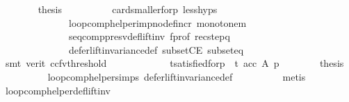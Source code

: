 \begin{isabellebody}
\ \ \ \ \ \ \isamarkupfalse%
\ {\isacharquery}{\kern0pt}thesis\isanewline
\ \ \ \ \ \ \ \ \isamarkupfalse%
\ card{\isacharunderscore}{\kern0pt}smaller{\isacharunderscore}{\kern0pt}for{\isacharunderscore}{\kern0pt}p\ less{\isachardot}{\kern0pt}hyps\isanewline
\ \ \ \ \ \ \ \ \ \ \ \ \ \ loop{\isacharunderscore}{\kern0pt}comp{\isacharunderscore}{\kern0pt}helper{\isacharunderscore}{\kern0pt}imp{\isacharunderscore}{\kern0pt}no{\isacharunderscore}{\kern0pt}def{\isacharunderscore}{\kern0pt}incr\ monotone{\isacharunderscore}{\kern0pt}m\isanewline
\ \ \ \ \ \ \ \ \ \ \ \ \ \ seq{\isacharunderscore}{\kern0pt}comp{\isacharunderscore}{\kern0pt}presv{\isacharunderscore}{\kern0pt}def{\isacharunderscore}{\kern0pt}lift{\isacharunderscore}{\kern0pt}inv\ f{\isacharunderscore}{\kern0pt}prof\ rec{\isacharunderscore}{\kern0pt}step{\isacharunderscore}{\kern0pt}q\isanewline
\ \ \ \ \ \ \ \ \ \ \ \ \ \ defer{\isacharunderscore}{\kern0pt}lift{\isacharunderscore}{\kern0pt}invariance{\isacharunderscore}{\kern0pt}def\ subsetCE\ subset{\isacharunderscore}{\kern0pt}eq\isanewline
\ \ \ \ \ \ \ \ \isamarkupfalse%
\ {\isacharparenleft}{\kern0pt}smt\ {\isacharparenleft}{\kern0pt}verit{\isacharcomma}{\kern0pt}\ ccfv{\isacharunderscore}{\kern0pt}threshold{\isacharparenright}{\kern0pt}{\isacharparenright}{\kern0pt}\isanewline
\ \ \ \ \isamarkupfalse%
\isanewline
\ \ \ \ \ \ \isamarkupfalse%
\ t{\isacharunderscore}{\kern0pt}satisfied{\isacharunderscore}{\kern0pt}for{\isacharunderscore}{\kern0pt}p{\isacharcolon}{\kern0pt}\ {\isachardoublequoteopen}{\isasymnot}\ {\isasymnot}t\ {\isacharparenleft}{\kern0pt}acc\ A\ p{\isacharparenright}{\kern0pt}{\isachardoublequoteclose}\isanewline
\ \ \ \ \ \ \isamarkupfalse%
\ {\isacharquery}{\kern0pt}thesis\isanewline
\ \ \ \ \ \ \ \ \isamarkupfalse%
\ loop{\isacharunderscore}{\kern0pt}comp{\isacharunderscore}{\kern0pt}helper{\isachardot}{\kern0pt}simps{\isacharparenleft}{\kern0pt}{}{\isacharparenright}{\kern0pt}\ defer{\isacharunderscore}{\kern0pt}lift{\isacharunderscore}{\kern0pt}invariance{\isacharunderscore}{\kern0pt}def\isanewline
\ \ \ \ \ \ \ \ \isamarkupfalse%
\ metis\isanewline
\ \ \ \ \isamarkupfalse%
\isanewline
\ \ \isamarkupfalse%
\isanewline
{}\isamarkupfalse%
%
\endisatagproof
{\isafoldproof}%
%
\isadelimproof
\isanewline
%
\endisadelimproof
\isanewline
{}\isamarkupfalse%
\ loop{\isacharunderscore}{\kern0pt}comp{\isacharunderscore}{\kern0pt}helper{\isacharunderscore}{\kern0pt}def{\isacharunderscore}{\kern0pt}lift{\isacharunderscore}{\kern0pt}inv{\isacharcolon}{\kern0pt}\isanewline

\end{isabellebody}
